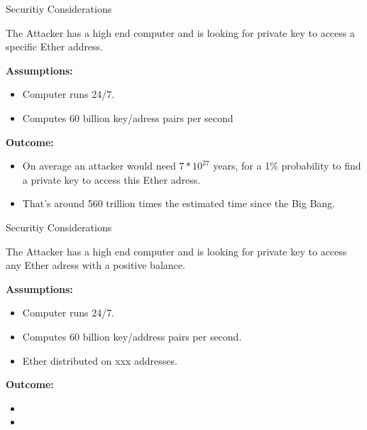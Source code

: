 \documentclass[]{beamer}
\begin{document}
\begin{frame}{Securitiy Considerations}

The Attacker has a high end computer and is looking for private key to access a specific Ether address.

\vspace{1em}

\textbf{Assumptions:}
\begin{itemize}
\item<1-> Computer runs 24/7.
\item<2-> Computes 60 billion key/adress pairs per second
\end{itemize}

\vspace{1em}

\textbf{Outcome:}
\begin{itemize}
\item<1-> On average an attacker would need $7*10^{27}$ years, for a 1\% probability to find a private key to access this Ether adress. 
\item<2-> That's around 560 trillion times the estimated time since the Big Bang.
\end{itemize}

\end{frame}

\begin{frame}{Securitiy Considerations}

The Attacker has a high end computer and is looking for private key to access any Ether adress with a positive balance.

\vspace{1em}

\textbf{Assumptions:}
\begin{itemize}
\item<1-> Computer runs 24/7. 
\item<2-> Computes 60 billion key/address pairs per second.
\item<3-> Ether distributed on xxx addresses.
\end{itemize}

\vspace{1em}

\textbf{Outcome:}
\begin{itemize}
\item<1-> 
\item<2-> 
\end{itemize}

\end{frame}
\end{document}
